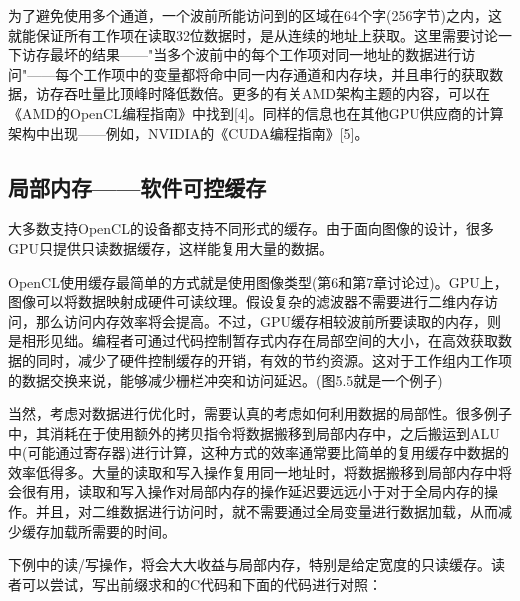 为了避免使用多个通道，一个波前所能访问到的区域在64个字(256字节)之内，这就能保证所有工作项在读取32位数据时，是从连续的地址上获取。这里需要讨论一下访存最坏的结果——"当多个波前中的每个工作项对同一地址的数据进行访问"——每个工作项中的变量都将命中同一内存通道和内存块，并且串行的获取数据，访存吞吐量比顶峰时降低数倍。更多的有关AMD架构主题的内容，可以在《AMD的OpenCL编程指南》中找到[4]。同样的信息也在其他GPU供应商的计算架构中出现——例如，NVIDIA的《CUDA编程指南》[5]。

\subsection{局部内存——软件可控缓存}

大多数支持OpenCL的设备都支持不同形式的缓存。由于面向图像的设计，很多GPU只提供只读数据缓存，这样能复用大量的数据。

OpenCL使用缓存最简单的方式就是使用图像类型(第6和第7章讨论过)。GPU上，图像可以将数据映射成硬件可读纹理。假设复杂的滤波器不需要进行二维内存访问，那么访问内存效率将会提高。不过，GPU缓存相较波前所要读取的内存，则是相形见绌。编程者可通过代码控制暂存式内存在局部空间的大小，在高效获取数据的同时，减少了硬件控制缓存的开销，有效的节约资源。这对于工作组内工作项的数据交换来说，能够减少栅栏冲突和访问延迟。(图5.5就是一个例子)

当然，考虑对数据进行优化时，需要认真的考虑如何利用数据的局部性。很多例子中，其消耗在于使用额外的拷贝指令将数据搬移到局部内存中，之后搬运到ALU中(可能通过寄存器)进行计算，这种方式的效率通常要比简单的复用缓存中数据的效率低得多。大量的读取和写入操作复用同一地址时，将数据搬移到局部内存中将会很有用，读取和写入操作对局部内存的操作延迟要远远小于对于全局内存的操作。并且，对二维数据进行访问时，就不需要通过全局变量进行数据加载，从而减少缓存加载所需要的时间。

下例中的读/写操作，将会大大收益与局部内存，特别是给定宽度的只读缓存。读者可以尝试，写出前缀求和的C代码和下面的代码进行对照：

